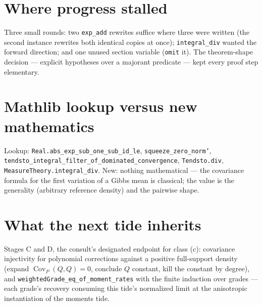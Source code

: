 \documentclass[11pt]{article}
\newcommand{\code}[1]{\texttt{#1}}
\begin{document}
\section{Where progress stalled}

Three small rounds: two \code{exp\_add} rewrites suffice where three
were written (the second instance rewrites both identical copies at
once); \code{integral\_div} wanted the forward direction; and one
unused section variable (\code{omit} it). The theorem-shape decision
--- explicit hypotheses over a majorant predicate --- kept every
proof step elementary.

\section{Mathlib lookup versus new mathematics}

\begin{sloppypar}
Lookup: \code{Real.abs\_exp\_sub\_one\_sub\_id\_le},
\code{squeeze\_zero\_norm'},
\code{tendsto\_integral\_filter\_of\_dominated\_convergence},
\code{Tendsto.div}, \code{MeasureTheory.integral\_div}. New: nothing
mathematical --- the covariance formula for the first variation of a
Gibbs mean is classical; the value is the generality (arbitrary
reference density) and the pairwise shape.
\end{sloppypar}

\section{What the next tide inherits}

Stages C and D, the consult's designated endpoint for class (c):
covariance injectivity for polynomial corrections against a positive
full-support density (expand
$\operatorname{Cov}_P(Q,Q) = 0$, conclude $Q$ constant, kill the
constant by degree), and
\code{weightedGrade\_eq\_of\_moment\_rates} with the finite
induction over grades --- each grade's recovery consuming this
tide's normalized limit at the anisotropic instantiation of the
moments tide.
\end{document}
